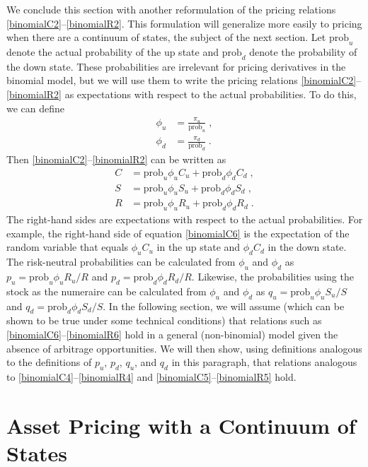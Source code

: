 We conclude this section with another reformulation of the pricing relations \eqref{binomialC2}--\eqref{binomialR2}.  This formulation will generalize more easily to pricing when there are a continuum of states, the subject of the next section.  
Let $\text{prob}_u$ denote the actual probability of the up state and $\text{prob}_d$ denote the probability of the down state.  These probabilities are irrelevant for pricing derivatives in the binomial model, but we will use them to write the pricing relations \eqref{binomialC2}--\eqref{binomialR2} as expectations with respect to the actual probabilities.  To do this, we can define
\begin{align*}
\phi_u &= \frac{\pi_u}{\text{prob}_u}\; ,\\
\phi_d &= \frac{\pi_d}{\text{prob}_d}\;.
\end{align*}
Then \eqref{binomialC2}--\eqref{binomialR2} can be written as
\begin{subequations}\begin{align}
C &= \text{prob}_u\phi_uC_u + \text{prob}_d\phi_dC_d\;,\label{binomialC6}\\
S &= \text{prob}_u\phi_uS_u + \text{prob}_d\phi_dS_d\;,\label{binomialS6}\\
R &= \text{prob}_u\phi_uR_u + \text{prob}_d\phi_dR_d\;.\label{binomialR6}
\end{align}\end{subequations}
The right-hand sides are expectations with respect to the actual probabilities.  For example, the right-hand side of equation \eqref{binomialC6} is the expectation of the random variable that equals $\phi_uC_u$ in the up state and $\phi_dC_d$ in the down state.  The risk-neutral probabilities can be calculated from $\phi_u$ and $\phi_d$ as
$p_u=\text{prob}_u\phi_uR_u/R$ and $p_d=\text{prob}_d\phi_dR_d/R$.  Likewise, the probabilities using the stock as the numeraire can be calculated from $\phi_u$ and $\phi_d$ as
$q_u=\text{prob}_u\phi_uS_u/S$ and $q_d=\text{prob}_d\phi_dS_d/S$.  In the following section, we will assume (which can be shown to be true under some technical conditions) that relations such as \eqref{binomialC6}--\eqref{binomialR6}  hold in a general (non-binomial) model given the absence of arbitrage opportunities.  We will then show, using definitions analogous to the definitions of $p_u$, $p_d$, $q_u$, and $q_d$ in this paragraph, that relations analogous to \eqref{binomialC4}--\eqref{binomialR4} and \eqref{binomialC5}--\eqref{binomialR5} hold.

\section{Asset Pricing with a Continuum of States}


